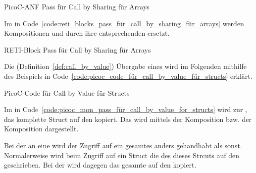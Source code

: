 \begin{code}
  \centering
  \caption{PicoC-ANF Pass für Call by Sharing für Arrays}
  \label{code:picoc_mon_pass_für_call_by_sharing_für_arrays}
\end{code}

Im  in Code~\ref{code:reti_blocks_pass_für_call_by_sharing_für_arrays} werden Kompositionen  und  durch ihre entsprechenden  ersetzt.

\begin{code}
  \centering
  \caption{RETI-Block Pass für Call by Sharing für Arrays}
  \label{code:reti_blocks_pass_für_call_by_sharing_für_arrays}
\end{code}



Die  (Definition~\ref{def:call_by_value}) Übergabe eines  wird im Folgenden mithilfe des Beispiels in Code~\ref{code:picoc_code_für_call_by_value_für_structs} erklärt.

\begin{code}
  \centering
  \caption{PicoC-Code für Call by Value für Structs}
  \label{code:picoc_code_für_call_by_value_für_structs}
\end{code}

Im  in Code~\ref{code:picoc_mon_pass_für_call_by_value_for_structs} wird zur , das komplette Struct auf den  kopiert. Das wird mittels der Komposition  bzw. der Komposition  dargestellt.

Bei der  an eine  wird der Zugriff auf ein gesamtes  anders gehandhabt als sonst. Normalerweise wird beim Zugriff auf ein Struct die  des  dieses Strcuts auf den  geschrieben. Bei der  wird dagegen das gesamte  auf den  kopiert.

